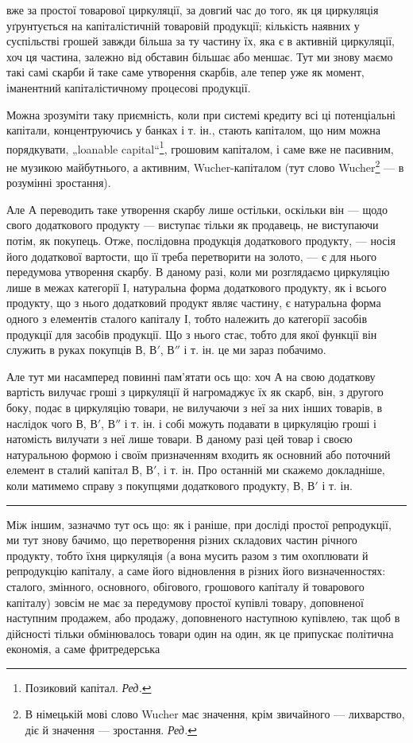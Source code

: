 \parcont{}  %
вже за простої товарової циркуляції, за довгий час до того, як ця циркуляція
уґрунтується на капіталістичній товаровій продукції; кількість
наявних у суспільстві грошей завжди більша за ту частину їх, яка є
в активній циркуляції, хоч ця частина, залежно від обставин більшає
або меншає. Тут ми знову маємо такі самі скарби й таке саме утворення
скарбів, але тепер уже як момент, іманентний капіталістичному процесові
продукції.

Можна зрозуміти таку приємність, коли при системі кредиту всі ці
потенціальні капітали, концентруючись у банках і т. ін., стають капіталом,
що ним можна порядкувати, „loanable capital“\footnote*{
Позиковий капітал. \emph{Ред.}
}, грошовим капіталом,
і саме вже не пасивним, не музикою майбутнього, а активним,
Wucher-капіталом (тут слово Wucher\footnote*{
В німецькій мові слово Wucher має значення, крім звичайного — лихварство,
діє й значення — зростання. \emph{Ред.}
} — в розумінні зростання).

Але $А$ переводить таке утворення скарбу лише остільки, оскільки він —
щодо свого додаткового продукту — виступає тільки як продавець, не виступаючи
потім, як покупець. Отже, послідовна продукція додаткового
продукту, — носія його додаткової вартости, що її треба перетворити
на золото, — є для нього передумова утворення скарбу. В даному разі,
коли ми розглядаємо циркуляцію лише в межах категорії І, натуральна
форма додаткового продукту, як і всього продукту, що з нього додатковий
продукт являє частину, є натуральна форма одного з елементів
сталого капіталу І, тобто належить до категорії засобів продукції для
засобів продукції. Що з нього стає, тобто для якої функції він служить
в руках покупців $В$, $В'$, $В''$ і т. ін. це ми зараз побачимо.

Але тут ми насамперед повинні пам’ятати ось що: хоч $А$ на свою
додаткову вартість вилучає гроші з циркуляції й нагромаджує їх як
скарб, він, з другого боку, подає в циркуляцію товари, не вилучаючи
з неї за них інших товарів, в наслідок чого $В$, $В'$,  $В''$ і т. ін. і собі
можуть подавати в циркуляцію гроші і натомість вилучати з неї лише
товари. В даному разі цей товар і своєю натуральною формою і своїм
призначенням входить як основний або поточний елемент в сталий капітал
$В$, $В'$, і т. ін. Про останній ми скажемо докладніше, коли матимемо
справу з покупцями додаткового продукту, $В$, $В'$ і т. ін.

\pfbreak

Між іншим, зазначмо тут ось що: як і раніше, при досліді простої
репродукції, ми тут знову бачимо, що перетворення різних складових
частин річного продукту, тобто їхня циркуляція (а вона мусить разом
з тим охоплювати й репродукцію капіталу, а саме його відновлення
в різних його визначенностях: сталого, змінного, основного, обігового,
грошового капіталу й товарового капіталу) зовсім не має за передумову
простої купівлі товару, доповненої наступним продажем, або продажу,
доповненого наступною купівлею, так щоб в дійсності тільки обмінювалось
товари один на один, як це припускає політична економія, а саме фритредерська
\parbreak{}  %
